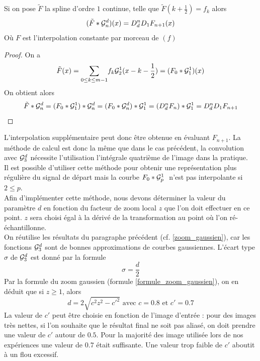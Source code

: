 \begin{prop}
Si on pose $\tilde{F}$ la spline d'ordre $1$ continue, telle que $\tilde{F}(k+\frac{1}{2})=f_k$ alors 
\begin{equation*}
( \tilde{F} * \mathcal{G}_n^d ) (x) = D_d^{n}D_1 F_{n+1}(x)
\end{equation*}
Où $F$ est l'interpolation constante par morceau de $(f)$ 
\end{prop}
\begin{proof}
On a
\begin{equation*}
\tilde{F}(x)=\displaystyle{\sum_{0\le k \le m-1}} f_k \mathcal{G}_2^1 (x-k-\frac{1}{2})=(F_{0} *\mathcal{G}_1^1 )(x)
\end{equation*}
On obtient alors 
\begin{equation*}
\tilde{F}*\mathcal{G}_n^d=(F_{0}*\mathcal{G}_1^1)*\mathcal{G}_n^d=(F_{0}*\mathcal{G}_n^d)*\mathcal{G}_1^1=(D_d^n F_{n})*\mathcal{G}_1^1= D_d^n D_1 F_{n+1}
\end{equation*}
\end{proof}
L'interpolation supplémentaire peut donc être obtenue en évaluant $F_{n+1}$. La méthode de calcul est donc la même que dans le cas précédent, la convolution avec $\mathcal{G}_3^d$ nécessite l'utilisation l'intégrale quatrième de l'image dans la pratique.\\
Il est possible d'utiliser cette méthode pour obtenir une représentation plus régulière du signal de départ mais la courbe $F_0 * \mathcal{G}_p^1~$ n'est pas interpolante si $2\le p$.\\
Afin d'implémenter cette méthode, nous devons déterminer la valeur du paramètre $d$ en fonction du facteur de zoom local $z$ que l'on doit effectuer en ce point. $z$ sera choisi égal à la dérivé de la transformation au point où l'on ré-échantillonne.\\ 
On réutilise les résultats du paragraphe précédent (cf. \ref{zoom_gaussien}), car les  fonctions $\mathcal{G}_3^d$ sont de bonnes approximations de courbes gaussiennes. L'écart type $\sigma$ de $\mathcal{G}_3^d$ est donné par la formule 
\begin{equation*}
\sigma=\frac{d}{2}
\end{equation*}
Par la formule du zoom gaussien (formule \ref{formule_zoom_gaussien}), on en déduit que si $z\ge 1$, alors
\begin{equation*}
d=2\sqrt{c^2 z^2 - c'^2} \text{ avec } c=0.8 \text{ et } c'=0.7
\end{equation*}
La valeur de $c'$ peut être choisie en fonction de l'image d'entrée : pour des images très nettes, si l'on souhaite que le résultat final ne soit pas aliasé, on doit prendre une valeur de $c'$ autour de $0.5$. Pour la majorité des image utilisée lors de nos expériences une valeur de $0.7$ était suffisante. Une valeur trop faible de $c'$ aboutit à un flou excessif.
